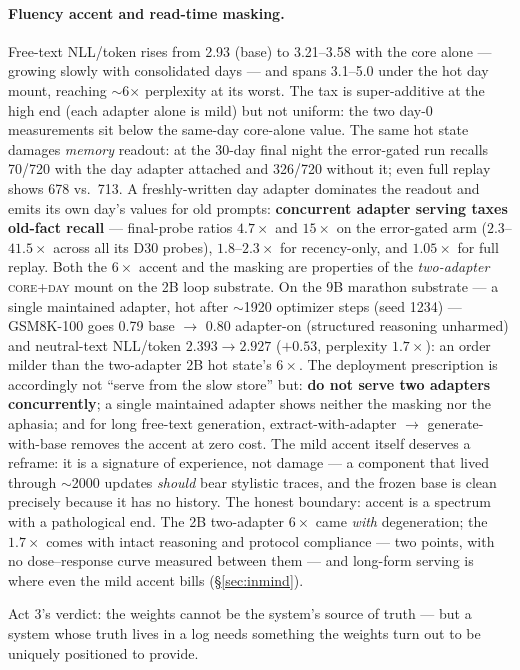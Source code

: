 \documentclass[11pt]{article}
\begin{document}
\paragraph{Fluency accent and read-time masking.} Free-text NLL/token rises from 2.93 (base) to
3.21--3.58 with the core alone --- growing slowly with consolidated days --- and spans 3.1--5.0
under the hot day mount, reaching $\sim$6$\times$ perplexity at its worst. The tax is
super-additive at the high end (each adapter alone is mild) but not uniform: the two day-0
measurements sit below the same-day core-alone value. The same hot state damages \emph{memory} readout: at the 30-day
final night the error-gated run recalls 70/720 with the day adapter attached and 326/720 without
it; even full replay shows 678 vs.\ 713. A freshly-written day adapter dominates the readout and
emits its own day's values for old prompts: \textbf{concurrent adapter serving taxes old-fact
recall} --- final-probe ratios $4.7\times$ and $15\times$ on the error-gated arm ($2.3$--$41.5\times$
across all its D30 probes), $1.8$--$2.3\times$ for recency-only, and $1.05\times$ for full
replay. Both the $6\times$ accent and the masking are properties of the \emph{two-adapter}
\textsc{core+day} mount on the 2B loop substrate. On the 9B marathon substrate --- a single
maintained adapter, hot after $\sim$1920 optimizer steps (seed 1234) --- GSM8K-100 goes 0.79
base $\to$ 0.80 adapter-on (structured reasoning unharmed) and neutral-text NLL/token
$2.393\to2.927$ ($+0.53$, perplexity $1.7\times$): an order milder than the two-adapter 2B hot
state's $6\times$. The deployment prescription is accordingly not ``serve from the slow store''
but: \textbf{do not serve two adapters concurrently}; a single maintained adapter shows neither
the masking nor the aphasia; and for long free-text generation, extract-with-adapter $\to$
generate-with-base removes the accent at zero cost. The mild accent itself deserves a reframe:
it is a signature of experience, not damage --- a component that lived through $\sim$2000
updates \emph{should} bear stylistic traces, and the frozen base is clean precisely because it
has no history. The honest boundary: accent is a spectrum with a pathological end. The 2B
two-adapter $6\times$ came \emph{with} degeneration; the $1.7\times$ comes with intact reasoning
and protocol compliance --- two points, with no dose--response curve measured between them ---
and long-form serving is where even the mild accent bills (\S\ref{sec:inmind}).

Act 3's verdict: the weights cannot be the system's source of truth --- but a system whose truth
lives in a log needs something the weights turn out to be uniquely positioned to provide.
\end{document}
